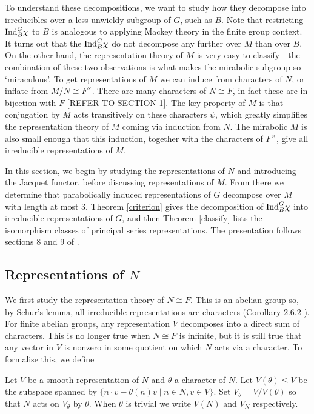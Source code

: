 To understand these decompositions, we want to study how they decompose into irreducibles over a less unwieldy subgroup of $G$, such as $B$. Note that restricting $\mathrm{Ind}_B^G \chi$ to $B$ is analogous to applying Mackey theory in the finite group context. It turns out that the $\mathrm{Ind}_B^G \chi$ do not decompose any further over $M$ than over $B$. On the other hand, the representation theory of $M$ is very easy to classify - the combination of these two observations is what makes the mirabolic subgroup so `miraculous'. To get representations of $M$ we can induce from characters of $N$, or inflate from $M/N\cong F^\times$. There are many characters of $N\cong F$, in fact these are in bijection with $F$ [REFER TO SECTION 1]. The key property of $M$ is that conjugation by $M$ acts transitively on these characters $\psi$, which greatly simplifies the representation theory of $M$ coming via induction from $N$. The mirabolic $M$ is also small enough that this induction, together with the characters of $F^\times$, give all irreducible representations of $M$.

In this section, we begin by studying the representations of $N$ and introducing the Jacquet functor, before discussing representations of $M$. From there we determine that parabolically induced representations of $G$ decompose over $M$ with length at most 3. Theorem \ref{criterion} gives the decomposition of $\mathrm{Ind}_B^G \chi$ into irreducible representations of $G$, and then Theorem \ref{classify} lists the isomorphism classes of principal series representations. The presentation follows sections 8 and 9 of \cite{BH1}.

\subsection{Representations of \texorpdfstring{$N$}{TEXT}}

We first study the representation theory of $N \cong F$. This is an abelian group so, by Schur's lemma, all irreducible representations are characters (Corollary 2.6.2 \cite{BH1}). For finite abelian groups, any representation $V$ decomposes into a direct sum of characters. This is no longer true when $N\cong F$ is infinite, but it is still true that any vector in $V$ is nonzero in some quotient on which $N$ acts via a character. To formalise this, we define

\begin{notn}
    Let $V$ be a smooth representation of $N$ and $\theta$ a character of $N$. Let $V(\theta) \leq V$ be the subspace spanned by $\{n\cdot v - \theta(n)v \mid n \in N, v \in V\}$. Set $V_\theta = V/V(\theta)$ so that $N$ acts on $V_\theta$ by $\theta$. When $\theta$ is trivial we write $V(N)$ and $V_N$ respectively. 
\end{notn}

